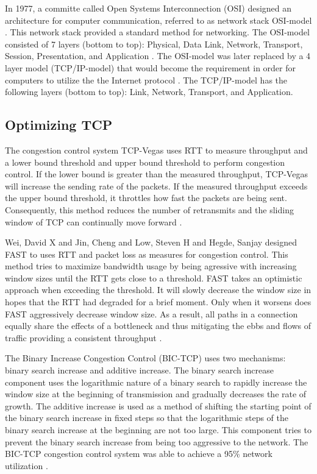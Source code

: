 In 1977, a committe called Open Systems Interconnection (OSI) designed an architecture for computer communication, referred to as network stack OSI-model \cite{zimmermann1980osi}. This network stack provided a standard method for networking. The OSI-model consisted of 7 layers (bottom to top): Physical, Data Link, Network, Transport, Session, Presentation, and Application \cite{zimmermann1980osi}. The OSI-model was later replaced by a 4 layer model (TCP/IP-model) that would become the requirement in order for computers to utilize the the Internet protocol \cite{braden1989requirements}. The TCP/IP-model has the following layers (bottom to top): Link, Network, Transport, and Application.

\subsection{Optimizing TCP}

The congestion control system TCP-Vegas \cite{brakmo1995tcp} uses RTT to measure throughput and a lower bound threshold and upper bound threshold to perform congestion control. If the lower bound is greater than the measured throughput, TCP-Vegas will increase the sending rate of the packets. If the measured throughput exceeds the upper bound threshold, it throttles how fast the packets are being sent. Consequently, this method reduces the number of retransmits and the sliding window of TCP can continually move forward \cite{brakmo1995tcp}.

Wei, David X and Jin, Cheng and Low, Steven H and Hegde, Sanjay designed FAST to uses RTT and packet loss as measures for congestion control. This method tries to maximize bandwidth usage by being agressive with increasing window sizes until the RTT gets close to a threshold. FAST takes an optimistic approach when exceeding the threshold. It will slowly decrease the window size in hopes that the RTT had degraded for a brief moment. Only when it worsens does FAST aggressively decrease window size. As a result, all paths in a connection equally share the effects of a bottleneck and thus mitigating the ebbs and flows of traffic providing a consistent throughput \cite{wei2006fast}.

The Binary Increase Congestion Control (BIC-TCP) \cite{xu2004binary} uses two mechanisms: binary search increase and additive increase. The binary search increase component uses the logarithmic nature of a binary search to rapidly increase the window size at the beginning of transmission and gradually decreases the rate of growth. The additive increase is used as a method of shifting the starting point of the binary search increase in fixed steps so that the logarithmic steps of the binary search increase at the beginning are not too large. This component tries to prevent the binary search increase from being too aggressive to the network. The BIC-TCP congestion control system was able to achieve a 95\% network utilization \cite{xu2004binary}.

